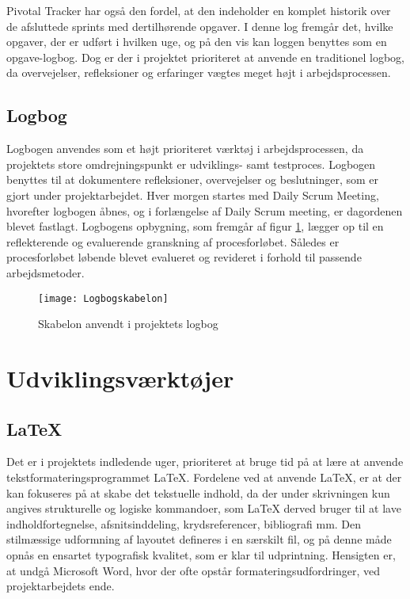 	Pivotal Tracker har også den fordel, at den indeholder en komplet historik over de afsluttede sprints med dertilhørende opgaver. I denne log fremgår det, hvilke opgaver, der er udført i hvilken uge, og på den vis kan loggen benyttes som en opgave-logbog. Dog er der i projektet prioriteret at anvende en traditionel logbog, da overvejelser, refleksioner og erfaringer vægtes meget højt i arbejdsprocessen.      		
	
	\subsection{Logbog}
	Logbogen anvendes som et højt prioriteret værktøj i arbejdsprocessen, da projektets store omdrejningspunkt er udviklings- samt testproces. Logbogen benyttes til at dokumentere refleksioner, overvejelser og beslutninger, som er gjort under projektarbejdet. Hver morgen startes med Daily Scrum Meeting, hvorefter logbogen åbnes, og i forlængelse af Daily Scrum meeting, er dagordenen blevet  fastlagt. Logbogens opbygning, som fremgår af figur \ref{fig:logbog}, lægger op til en reflekterende og evaluerende granskning af procesforløbet. Således er procesforløbet løbende blevet evalueret og revideret i forhold til passende arbejdsmetoder. 
	
	\begin{figure}[htb]
	\centering
	\texttt{[image: Logbogskabelon]}
	\caption{Skabelon anvendt i projektets logbog}
	\label{fig:logbog}	
	\end{figure}	

\section{Udviklingsværktøjer}
	 
	\subsection{\LaTeX}
Det er i projektets indledende uger, prioriteret at bruge tid på at lære at anvende tekstformateringsprogrammet \LaTeX. Fordelene ved at anvende LaTeX, er at der kan fokuseres på at skabe det tekstuelle indhold, da der under skrivningen kun angives strukturelle og logiske kommandoer, som LaTeX derved bruger til at lave indholdfortegnelse, afsnitsinddeling, krydsreferencer, bibliografi mm. Den stilmæssige udformning af layoutet defineres i en særskilt fil, og på denne måde opnås en ensartet typografisk kvalitet, som er klar til udprintning. Hensigten er, at undgå Microsoft Word, hvor der ofte opstår formateringsudfordringer, ved projektarbejdets ende. 
    
